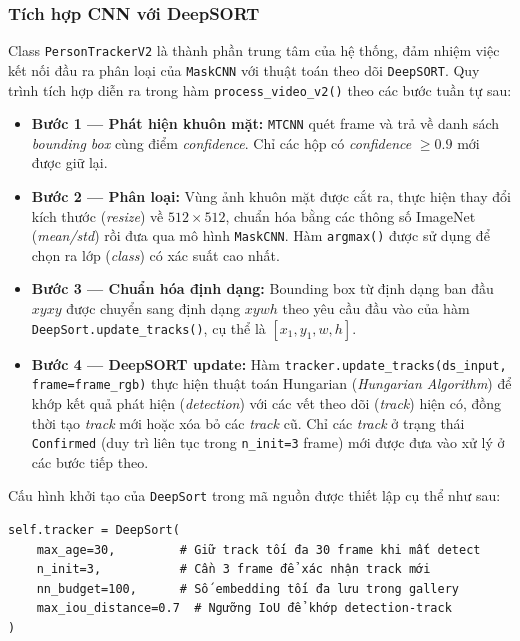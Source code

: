 \documentclass[a4paper,12pt]{article}
\begin{document}
\subsubsection{Tích hợp CNN với DeepSORT}
Class \texttt{PersonTrackerV2} là thành phần trung tâm của hệ thống, đảm nhiệm việc kết nối đầu ra phân loại của \texttt{MaskCNN} với thuật toán theo dõi \texttt{DeepSORT}. Quy trình tích hợp diễn ra trong hàm \texttt{process\_video\_v2()} theo các bước tuần tự sau:

\begin{itemize}

\item \textbf{Bước 1 --- Phát hiện khuôn mặt:} \texttt{MTCNN} quét frame và trả về danh sách \textit{bounding box} cùng điểm \textit{confidence}. Chỉ các hộp có \textit{confidence} $\ge 0.9$ mới được giữ lại.

\item \textbf{Bước 2 --- Phân loại:} Vùng ảnh khuôn mặt được cắt ra, thực hiện thay đổi kích thước (\textit{resize}) về $512 \times 512$, chuẩn hóa bằng các thông số ImageNet (\textit{mean/std}) rồi đưa qua mô hình \texttt{MaskCNN}. Hàm \texttt{argmax()} được sử dụng để chọn ra lớp (\textit{class}) có xác suất cao nhất.

\item \textbf{Bước 3 --- Chuẩn hóa định dạng:} Bounding box từ định dạng ban đầu $xyxy$ được chuyển sang định dạng $xywh$ theo yêu cầu đầu vào của hàm \texttt{DeepSort.update\_tracks()}, cụ thể là $[x_1, y_1, w, h]$.

\item \textbf{Bước 4 --- DeepSORT update:} Hàm \texttt{tracker.update\_tracks(ds\_input, frame=frame\_rgb)} thực hiện thuật toán Hungarian (\textit{Hungarian Algorithm}) để khớp kết quả phát hiện (\textit{detection}) với các vết theo dõi (\textit{track}) hiện có, đồng thời tạo \textit{track} mới hoặc xóa bỏ các \textit{track} cũ. Chỉ các \textit{track} ở trạng thái \texttt{Confirmed} (duy trì liên tục trong \texttt{n\_init=3} frame) mới được đưa vào xử lý ở các bước tiếp theo.

\end{itemize}

Cấu hình khởi tạo của \texttt{DeepSort} trong mã nguồn được thiết lập cụ thể như sau:

\begin{verbatim}
self.tracker = DeepSort(
    max_age=30,         # Giữ track tối đa 30 frame khi mất detect
    n_init=3,           # Cần 3 frame để xác nhận track mới
    nn_budget=100,      # Số embedding tối đa lưu trong gallery
    max_iou_distance=0.7  # Ngưỡng IoU để khớp detection-track
)
\end{verbatim}
\end{document}
